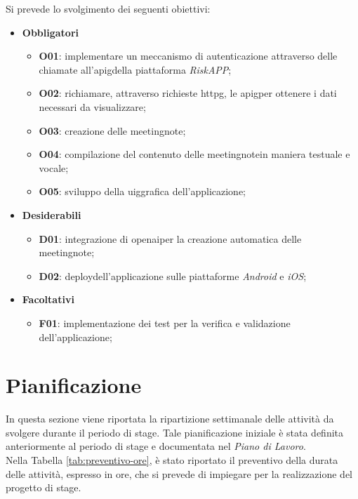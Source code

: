 Si prevede lo svolgimento dei seguenti obiettivi:
\begin{itemize}
    \item \textbf{Obbligatori}
    \begin{itemize}
        \item \textbf{O01}\label{O01}: implementare un meccanismo di autenticazione attraverso delle chiamate all'\gls{apig}\glsoccur della piattaforma \emph{RiskAPP};
        \item \textbf{O02}\label{O02}: richiamare, attraverso richieste \gls{httpg}\glsoccur, le \gls{apig}\glsoccur per ottenere i dati necessari da visualizzare;
        \item \textbf{O03}\label{O03}: creazione delle \gls{meetingnote}\glsoccur;
        \item \textbf{O04}\label{O04}: compilazione del contenuto delle \gls{meetingnote}\glsoccur in maniera testuale e vocale;
        \item \textbf{O05}\label{O05}: sviluppo della \gls{uig}\glsoccur grafica dell'applicazione;
    \end{itemize}
    \item \textbf{Desiderabili}
    \begin{itemize}
        \item \textbf{D01}\label{D01}: integrazione di \gls{openai}\glsoccur per la creazione automatica delle \gls{meetingnote}\glsoccur;
        \item \textbf{D02}\label{D02}: \gls{deploy}\glsoccur dell'applicazione sulle piattaforme \emph{Android} e \emph{iOS};
    \end{itemize}
    \item \textbf{Facoltativi}
    \begin{itemize}
        \item \textbf{F01}\label{F01}: implementazione dei test per la verifica e validazione dell'applicazione;
    \end{itemize}
\end{itemize}

\section{Pianificazione}
\label{sec:pianificazione}

In questa sezione viene riportata la ripartizione settimanale delle attività da svolgere durante il periodo di stage. 
Tale pianificazione iniziale è stata definita anteriormente al periodo di stage e documentata nel \emph{Piano di Lavoro}.\\
Nella Tabella \ref{tab:preventivo-ore}, è stato riportato il preventivo della durata delle attività, espresso in ore, che si prevede di impiegare per la realizzazione del progetto di stage. \\

